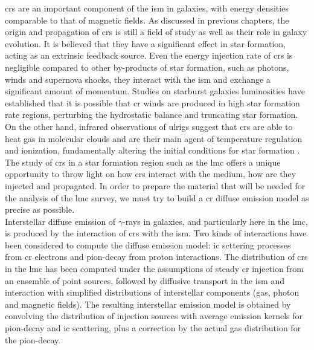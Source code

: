 \documentclass[main.tex]{subfiles}
\begin{document}
\glspl{cr} are an important component of the \gls{ism} in galaxies, with energy densities comparable to that of magnetic fields. As discussed in previous chapters, the origin and propagation of \glspl{cr} is still a field of study as well as their role in galaxy evolution. It is believed that they have a significant effect in star formation, acting as an extrinsic feedback source. Even the energy injection rate of \glspl{cr} is negligible compared to other by-products of star formation, such as photons, winds and supernova shocks, they interact with the \gls{ism} and exchange a significant amount of momentum. Studies on starburst galaxies luminosities \cite{2008SocratesCRandSF} have established that it is possible that \gls{cr} winds are produced in high star formation rate regions, perturbing the hydrostatic balance and truncating star formation. On the other hand, infrared observations of \gls{ulrigs} suggest that \glspl{cr} are able to heat gas in molecular clouds and are their main agent of temperature regulation and ionization, fundamentally altering the initial conditions for star formation \cite{2010PapadopoulosCRinSF}. The study of \glspl{cr} in a star formation region such as the \gls{lmc} offers a unique opportunity to throw light on how \glspl{cr} interact with the medium, how are they injected and propagated. In order to prepare the material that will be needed for the analysis of the \gls{lmc} survey, we must try to build a \gls{cr} diffuse emission model as precise as possible.\\
Interstellar diffuse emission of $\gamma$-rays in galaxies, and particularly here in the \gls{lmc}, is produced by the interaction of \glspl{cr} with the \gls{ism}. Two kinds of interactions have been considered to compute the diffuse emission model: \gls{ic} scttering processes from \gls{cr} electrons and pion-decay from proton interactions. The distribution of \glspl{cr} in the \gls{lmc} has been computed under the assumptions of steady \gls{cr} injection from an ensemble of point sources, followed by diffusive transport in the \gls{ism} and interaction with simplified distributions of interstellar components (gas, photon and magnetic fields). The resulting interstellar emission model is obtained by convolving the distribution of injection sources with average emission kernels for pion-decay and \gls{ic} scattering, plus a correction by the actual gas distribution for the pion-decay.\\
\end{document}
